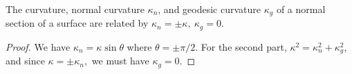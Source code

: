 \begin{cor}
    The curvature, normal curvature $\kappa_n $, and geodesic curvature $\kappa_g$ of a normal section of a surface are related by $\kappa_n =\pm \kappa,\ \kappa_g=0$.
\end{cor}
\begin{proof}
    We have $\kappa_n =\kappa\sin \theta$ where $\theta=\pm\pi /2$. For the second part, $\kappa^2=\kappa_n ^2+\kappa_g^2$, and since $\kappa=\pm \kappa_n ,$ we must have $\kappa_g=0$.
\end{proof}
